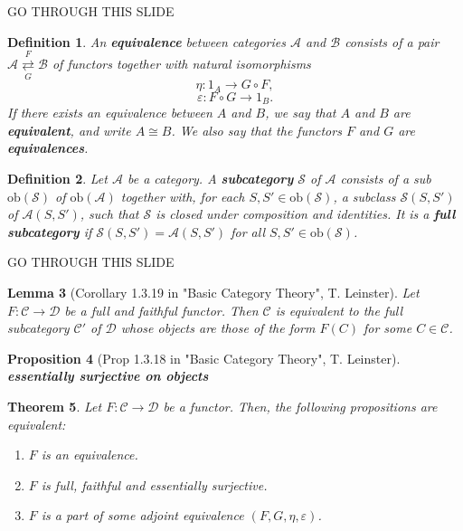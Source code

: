 \documentclass[dvipdfmx,10pt,notheorems]{beamer}
\newtheorem{theorem}{Theorem}[section]
\newtheorem{definition}[theorem]{Definition}
\newtheorem{proposition}[theorem]{Proposition}
\newtheorem{lemma}[theorem]{Lemma}
\renewcommand{\#}{^\sharp}
\begin{document}
	\begin{frame}{GO THROUGH THIS SLIDE}
			\begin{definition}
					An {\bf equivalence} between categories $\mathcal{A}$ and $\mathcal{B}$ consists of
					a pair $\mathcal{A}\overset{F}{\underset{G}{\rightleftarrows}}\mathcal{B}$
					of functors together with natural isomorphisms
							$$
									\eta:1_A\rightarrow G\circ F,
							$$
							$$
									 \varepsilon:F\circ G\rightarrow 1_B.
							$$
					If there exists an equivalence between $A$ and $B$, we say that $A$ and $B$ are
					{\bf equivalent}, and write $A\cong B$.
					We also say that the functors $F$ and $G$ are {\bf equivalences}.
			\end{definition}
			\begin{definition}
					Let $\mathcal{A}$ be a category. A {\bf subcategory} $\mathcal{S}$ of $\mathcal{A}$
					consists of a sub $\mathrm{ob}(\mathcal{S})$ of $\mathrm{ob}(\mathcal{A})$ together with,
					for each $S, S' \in\mathrm{ob}(\mathcal{S})$, a subclass $\mathcal{S}(S, S')$ of $\mathcal{A}(S, S')$,
					such that $\mathcal{S}$ is closed under composition and identities.
					It is a {\bf full subcategory} if $\mathcal{S}(S, S') = \mathcal{A}(S, S')$ for all $S, S'\in\mathrm{ob}(\mathcal{S})$.
			\end{definition}
	\end{frame}
	
	
	
	\begin{frame}{GO THROUGH THIS SLIDE}
			\begin{lemma}[Corollary 1.3.19 in "Basic Category Theory", T. Leinster]
					Let $F: \mathcal{C} \rightarrow \mathcal{D}$ be a full and faithful functor. Then $\mathcal{C}$ is
					equivalent to the full subcategory $\mathcal{C'}$
					of $\mathcal{D}$ whose objects are those of the form
					$F(C)$ for some $C\in \mathcal{C}$.
			\end{lemma}
			\begin{proposition}[Prop 1.3.18 in "Basic Category Theory", T. Leinster]
					 {\bf essentially surjective on objects}
			\end{proposition}
			\begin{theorem}
					Let $F:\mathcal{C}\rightarrow\mathcal{D}$ be a functor. Then, the following propositions are equivalent:
							\begin{enumerate}
									\item $F$ is an equivalence.
									\item $F$ is full, faithful and essentially surjective.
									\item $F$ is a part of some adjoint equivalence $(F, G, \eta, \varepsilon)$.
							\end{enumerate}
			\end{theorem}
	\end{frame}
	
\end{document}
